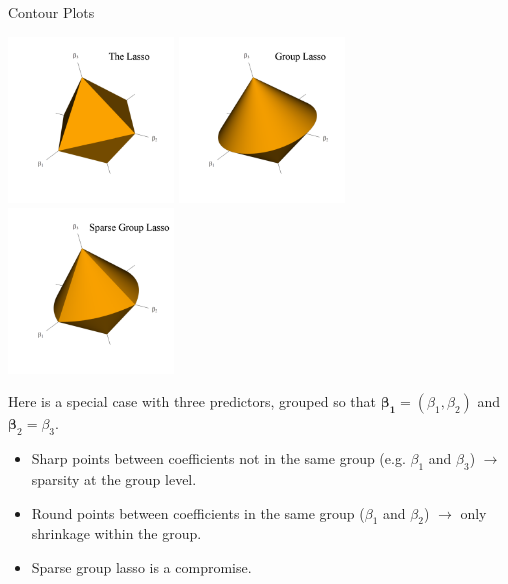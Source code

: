 \documentclass[8pt]{beamer}
\begin{document}
\begin{frame}{Contour Plots}

\begin{center}
    \includegraphics[width = 0.33\textwidth]{3D_cont_lasso.pdf}
    \includegraphics[width = 0.33\textwidth]{3D_cont_glasso.pdf}
    \includegraphics[width = 0.33\textwidth]{3D_cont_sglasso.pdf}
\end{center}

Here is a special case with three predictors, grouped so that $\bm{\beta_1} = (\beta_1, \beta_2)$ and $\bm{\beta}_2 = \beta_3$.
\begin{itemize}
    \item Sharp points between coefficients not in the same group (e.g. $\beta_1$ and $\beta_3$) $\to$ sparsity at the group level.
    \item Round points between coefficients in the same group ($\beta_1$ and $\beta_2$) $\to$ only shrinkage within the group.
    \item Sparse group lasso is a compromise.
\end{itemize}
    
\end{frame}
\end{document}
